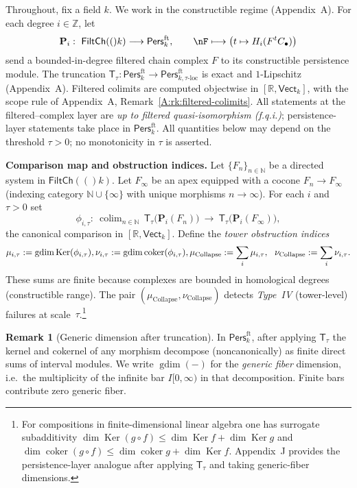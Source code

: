 \documentclass[11pt]{article}
\numberwithin{equation}{section}
\theoremstyle{plain}
\theoremstyle{definition}
\theoremstyle{remark}
\DeclareMathOperator{\colim}{colim}
\DeclareMathOperator{\Ker}{Ker}
\DeclareMathOperator{\gdim}{gdim}
\newcommand{\RR}{\mathbb{R}}
\newcommand{\ZZ}{\mathbb{Z}}
\newcommand{\Pers}{\mathsf{Pers}}
\newcommand{\Vect}{\mathsf{Vect}}
\newcommand{\T}{\mathsf{T}}
\theoremstyle{plain}
\theoremstyle{definition}
\numberwithin{equation}{section}
\theoremstyle{definition}
\newtheorem{remark}[theorem]{Remark}
\DeclareRobustCommand{\FiltCh}[1]{\mathsf{FiltCh}(#1)}
\DeclareRobustCommand{\muc}{\mu_{\mathrm{Collapse}}}
\DeclareRobustCommand{\nuc}{\nu_{\mathrm{Collapse}}}
\numberwithin{equation}{section}
\theoremstyle{plain}
\theoremstyle{definition}
\theoremstyle{remark}
\newcommand{\NN}{\mathbb{N}}
\newcommand{\Pfun}{\mathbf{P}}
\DeclareMathOperator{\coker}{coker} %
\providecommand{\muc}{\mu_{\mathrm{Collapse}}}
\providecommand{\nuc}{\nu_{\mathrm{Collapse}}}
\providecommand{\n}{\unskip\space}
\begin{document}

\usetikzlibrary{arrows.meta,cd}
Throughout, fix a field \(k\).
We work in the constructible regime (Appendix~A).
For each degree \(i\in\ZZ\), let
\[
\Pfun_i:\ \FiltCh(k)\longrightarrow \Pers^{\mathrm{ft}}_k,\n\qquad\nF\longmapsto \big(t\mapsto H_i(F^{t}C_\bullet)\big)
\]
send a bounded-in-degree filtered chain complex \(F\) to its constructible persistence module.
The truncation \(\T_\tau:\Pers^{\mathrm{ft}}_k\to\Pers^{\mathrm{ft}}_{k,\tau\text{-loc}}\) is exact and \(1\)-Lipschitz (Appendix~A).
Filtered colimits are computed objectwise in \([\RR,\Vect_k]\), with the scope rule of Appendix~A, Remark~\ref{A:rk:filtered-colimits}.
All statements at the filtered–complex layer are \emph{up to filtered quasi-isomorphism (f.q.i.)}; persistence-layer statements take place in \(\Pers^{\mathrm{ft}}_k\).
All quantities below may depend on the threshold \(\tau>0\); no monotonicity in \(\tau\) is asserted.

\medskip
\noindent\textbf{Comparison map and obstruction indices.}
Let \(\{F_n\}_{n\in\NN}\) be a directed system in \(\FiltCh(k)\).
Let \(F_\infty\) be an apex equipped with a cocone \(F_n\to F_\infty\) (indexing category \(\NN\cup\{\infty\}\) with unique morphisms \(n\to\infty\)).
For each \(i\) and \(\tau>0\) set
\[
\phi_{i,\tau}:\ \colim_{n\in\NN}\, \T_\tau\!\big(\Pfun_i(F_n)\big)\ \longrightarrow\ \T_\tau\!\big(\Pfun_i(F_\infty)\big),
\]
the canonical comparison in \([\RR,\Vect_k]\).
Define the \emph{tower obstruction indices}
\[
\mu_{i,\tau}:=\gdim\Ker(\phi_{i,\tau}),\n\qquad\n\nu_{i,\tau}:=\gdim\coker(\phi_{i,\tau}),\n\qquad\n\muc:=\sum_i\mu_{i,\tau},\ \ \nuc:=\sum_i\nu_{i,\tau}.
\]
These sums are finite because complexes are bounded in homological degrees (constructible range).
The pair \((\muc,\nuc)\) detects \emph{Type~IV} (tower-level) failures at scale~\(\tau\).\footnote{For compositions in finite-dimensional linear algebra one has surrogate subadditivity
\(\dim\Ker(g\circ f)\le \dim\Ker f+\dim\Ker g\) and
\(\dim\coker(g\circ f)\le \dim\coker g+\dim\Ker f\).
Appendix~J provides the persistence-layer analogue after applying \(\T_\tau\) and taking generic-fiber dimensions.}

\begin{remark}[Generic dimension after truncation]\label{rem:D-generic-dim}
In \(\Pers^{\mathrm{ft}}_k\), after applying \(\T_\tau\) the kernel and cokernel of any morphism decompose (noncanonically) as finite direct sums of interval modules.
We write \(\gdim(-)\) for the \emph{generic fiber} dimension, i.e.\ the multiplicity of the infinite bar \(I[0,\infty)\) in that decomposition.
Finite bars contribute zero generic fiber.
\end{remark}
\end{document}
